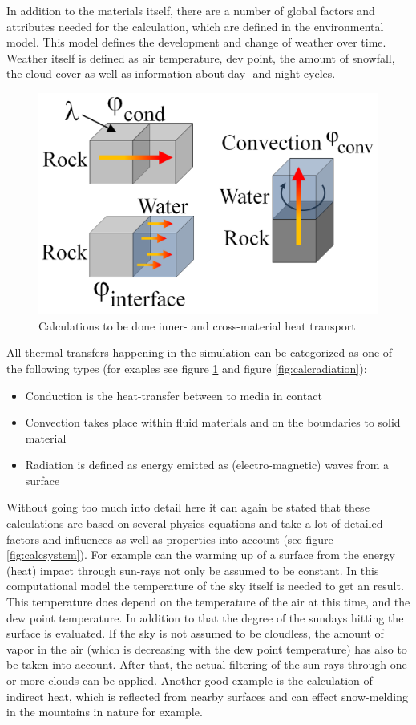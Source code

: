 In addition to the materials itself, there are a number of global factors and attributes needed for the calculation, which are defined in the environmental model. This model defines the development and change of weather over time. Weather itself is defined as air temperature, dev point, the amount of snowfall, the cloud cover as well as information about day- and night-cycles.

\begin{figure}[htb]
	\centering
	\includegraphics[width=\linewidth]{BF01/sem_heat_merged1.png}
	\caption{Calculations to be done inner- and cross-material heat transport}
	\label{fig:calcheattransport}
\end{figure}

All thermal transfers happening in the simulation can be categorized as one of the following types (for exaples see figure \ref{fig:calcheattransport} and figure \ref{fig:calcradiation}):
\begin{itemize}
	\item Conduction is the heat-transfer between to media in contact
	\item Convection takes place within fluid materials and on the boundaries to solid material
	\item Radiation is defined as energy emitted as (electro-magnetic) waves from a surface
\end{itemize}

Without going too much into detail here it can again be stated that these calculations are based on several physics-equations and take a lot of detailed factors and influences as well as properties into account (see figure \ref{fig:calcsystem}). For example can the warming up of a surface from the energy (heat) impact through sun-rays not only be assumed to be constant. In this computational model the temperature of the sky itself is needed to get an result. This temperature does depend on the temperature of the air at this time, and the dew point temperature. In addition to that the degree of the sundays hitting the surface is evaluated. If the sky is not assumed to be cloudless, the amount of vapor in the air (which is decreasing with the dew point temperature) has also to be taken into account. After that, the actual filtering of the sun-rays through one or more clouds can be applied. Another good example is the calculation of indirect heat, which is reflected from nearby surfaces and can effect snow-melding in the mountains in nature for example.

